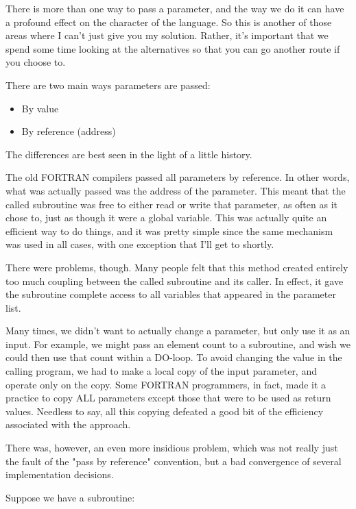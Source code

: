 There is more than one way to pass a parameter, and the way we do it can have a  profound  effect on the character of the language. So  this is another of those areas where I can't just give you my solution. Rather, it's important that we spend some time looking at the  alternatives  so  that  you  can  go another route if you choose to.

There are two main ways parameters are passed:

\begin{itemize}
\item	By value
\item	By reference (address)
\end{itemize}

The differences are best seen in the light of a little history.

The old FORTRAN compilers passed all parameters by reference. In other  words, what was actually passed was  the  address  of  the parameter. This meant  that  the  called  subroutine was free to either read or  write  that  parameter, as often as it chose to, just  as though it were a global variable. This  was  actually quite an efficient  way  to  do  things, and it was pretty simple since  the  same  mechanism  was  used  in  all cases, with  one exception that I'll get to shortly.

There were problems, though. Many people felt  that  this method created entirely too much coupling between the  called subroutine and  its  caller. In  effect, it gave the subroutine  complete access to all variables that appeared in the parameter list.

Many  times, we  didn't want to actually change a parameter, but only use it as an input. For example, we  might  pass an element count  to a subroutine, and wish we could  then  use  that  count within a DO-loop. To  avoid  changing the value in the calling program, we had to make a local copy of the input  parameter, and operate only on the  copy. Some  FORTRAN programmers, in fact, made it a practice to copy ALL parameters except those  that were to be used as return values. Needless to say, all this copying defeated  a  good  bit  of  the  efficiency  associated with  the approach.

There was, however, an even more insidious problem, which was not really just the fault of  the "pass by reference" convention, but a bad convergence of several implementation decisions.

Suppose we have a subroutine:

